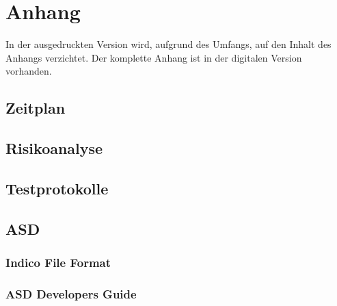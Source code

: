 \chapter{Anhang}
In der ausgedruckten Version wird, aufgrund des Umfangs, auf den Inhalt des Anhangs verzichtet. Der komplette Anhang ist in der digitalen Version vorhanden.

\section{Zeitplan}
\section{Risikoanalyse}
\section{Testprotokolle} \label{sec:testProtocolls}
\section{ASD} \label{sec:asd}
\subsection{Indico File Format}
\subsection{ASD Developers Guide} \label{subsection:developersGuide}




